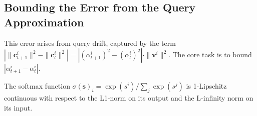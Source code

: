 \subsection{Bounding the Error from the Query Approximation}

This error arises from query drift, captured by the term \( \left| \|\mathbf{c}_{t+1}^i\|^2 - \|\mathbf{c}_t^i\|^2 \right| = \left| (\alpha_{t+1}^i)^2 - (\alpha_t^i)^2 \right| \cdot \|\mathbf{v}^i\|^2 \). The core task is to bound \( |\alpha_{t+1}^i - \alpha_t^i| \).

\begin{lemma}
\label{lemma:softmax_lipschitz}
The softmax function \( \sigma(\mathbf{s})_i = \exp(s^i)/\sum_j \exp(s^j) \) is 1-Lipschitz continuous with respect to the L1-norm on its output and the L-infinity norm on its input.
\end{lemma}
